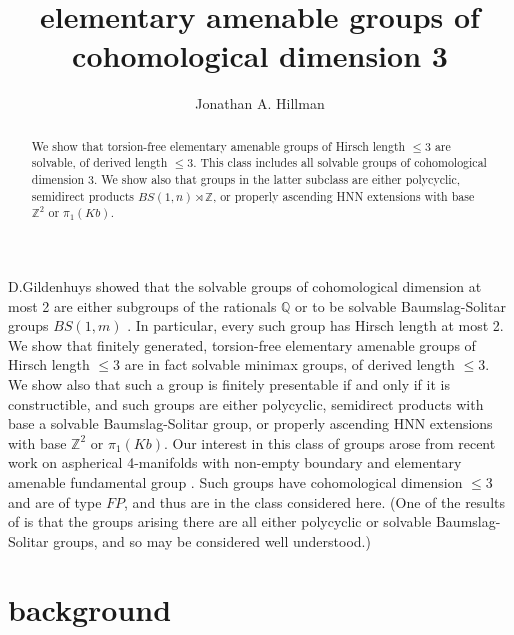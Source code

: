 \documentclass[12pt]{amsart}
\renewcommand{\leq}{\leqslant}
\begin{document}
\title[elementary amenable groups]
{elementary amenable  groups of cohomological dimension 3}

\author{Jonathan A. Hillman }
\address{School of Mathematics and Statistics\\
     University of Sydney, NSW 2006\\
      Australia }


\begin{abstract}
We show that torsion-free elementary amenable groups of Hirsch length $\leq3$ are solvable, of derived length $\leq3$.
This class includes all solvable groups of cohomological dimension $3$.
We show also that groups in the latter subclass are either polycyclic,
semidirect products $BS(1,n)\rtimes\mathbb{Z}$,
or properly ascending HNN extensions with base $\mathbb{Z}^2$ 
or $\pi_1(Kb)$.
\end{abstract}


\maketitle

D.Gildenhuys showed that the solvable groups of cohomological dimension at most 2 are either subgroups of the rationals $\mathbb{Q}$
or to be solvable Baumslag-Solitar groups $BS(1,m)$ \cite{Gi79}.
In particular, every such group has Hirsch length at most 2.
We show that finitely generated, torsion-free elementary amenable groups 
of Hirsch length $\leq3$ are in fact solvable minimax groups, 
of derived length $\leq3$.
We show also that such a group is finitely presentable if and only if it is constructible,
and such groups are either polycyclic,
semidirect products with base a solvable Baumslag-Solitar group,
or properly ascending HNN extensions with base $\mathbb{Z}^2$ 
or $\pi_1(Kb)$.
Our interest in this class of groups arose from recent work 
on aspherical 4-manifolds with non-empty boundary and elementary amenable fundamental group \cite{DH22}.
Such groups have cohomological dimension $\leq3$ and are of type $FP$,
and thus are in the class considered here.
(One of the results of \cite{DH22} is that the groups arising there are all 
either polycyclic or solvable Baumslag-Solitar groups, 
and so may be considered well understood.)

\section{background}
\end{document}
